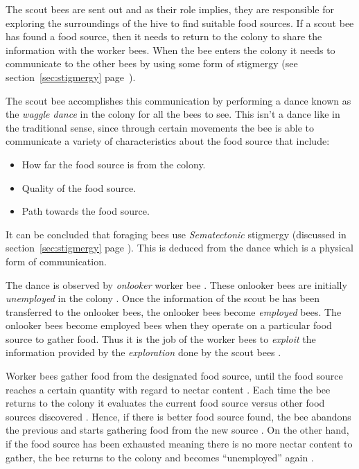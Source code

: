 The scout bees are sent out and as their role implies, they are responsible for exploring the surroundings of the hive to find suitable food sources\cite{ABCCompareStudy}. If a scout bee has found a food source, then it needs to return to the colony to share the information with the worker bees\cite{ABCCompareStudy}. When the bee enters the colony it needs to communicate to the other bees by using some form of stigmergy (see section~\ref{sec:stigmergy} page~\pageref{def:stigmergy})\cite{ABCCompareStudy}.

The scout bee accomplishes this communication by performing a dance known as the \emph{waggle dance} in the colony for all the bees to see\cite{ABCCompareStudy}. This isn't a dance like in the traditional sense, since through certain movements the bee is able to communicate a variety of characteristics about the food source that include\cite{ABCCompareStudy}:
\begin{itemize}
\item How far the food source is from the colony.
\item Quality of the food source.
\item Path towards the food source.
\end{itemize}

It can be concluded that foraging bees use \emph{Sematectonic} stigmergy (discussed in section~\ref{sec:stigmergy} page \pageref{def:sematectonic}). This is deduced from the dance which is a physical form of communication.

The dance is observed by \emph{onlooker} worker bee \cite{ABCCompareStudy,ABCImageEnhancement}. These onlooker bees are initially \emph{unemployed} in the colony \cite{ABCCompareStudy,ABCImageEnhancement}. Once the information of the scout be has been transferred to the onlooker bees, the onlooker bees become \emph{employed} bees\cite{ABCCompareStudy,ABCImageEnhancement}. The onlooker bees become employed bees when they operate on a particular food source to gather food\cite{ABCCompareStudy,ABCImageEnhancement}. Thus it is the job of the worker bees to \emph{exploit} the information provided by the \emph{exploration} done by the scout bees \cite{ABCCompareStudy,ABCNumericalOptimization}. 

Worker bees gather food from the designated food source, until the food source reaches a certain quantity with regard to nectar content \cite{ABCCompareStudy,ABCNumericalOptimization}. Each time the bee returns to the colony it evaluates the current food source versus other food sources discovered \cite{ABCCompareStudy,ABCNumericalOptimization}. Hence, if there is better food source found, the bee abandons the previous and starts gathering food from the new source \cite{ABCCompareStudy,ABCNumericalOptimization}. On the other hand, if the food source has been exhausted meaning there is no more nectar content to gather, the bee returns to the colony and becomes ``unemployed'' again \cite{ABCCompareStudy,ABCNumericalOptimization}.


